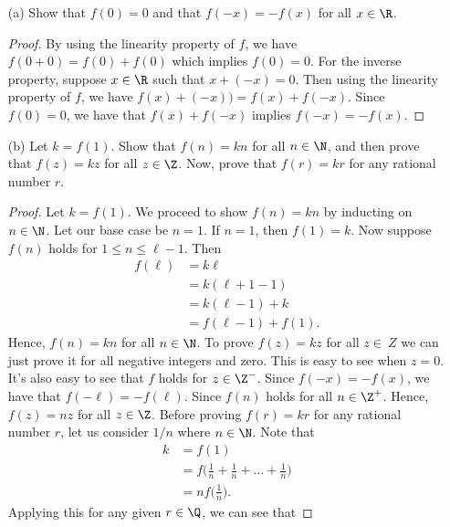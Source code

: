 \begin{enumerate}
    \item[(a)] Show that \( f(0) = 0  \) and that \( f(-x) = - f(x) \) for all \( x \in \R  \).
        \begin{proof}
        By using the linearity property of \( f \), we have \( f(0 + 0) = f(0) + f(0)  \) which implies \( f(0) = 0 \). For the inverse property, suppose \( x \in \R  \) such that \( x + (-x) = 0  \). Then using the linearity property of \( f \), we have \( f(x) + (-x)) = f(x) + f(-x)   \). Since \( f(0) = 0  \), we have that \( f(x) + f(-x) \) implies \( f(-x) = -f(x)   \).
        \end{proof}
    \item[(b)] Let \( k = f(1) \). Show that \( f(n) = k n \) for all \( n \in \N  \), and then prove that \( f(z) = kz \) for all \( z \in \Z  \). Now, prove that \( f(r) = kr \) for any rational number \( r \).
        \begin{proof}
        Let \( k = f(1) \). We proceed to show \( f(n) = kn \) by inducting on \( n \in \N  \). Let our base case be \( n = 1  \). If \( n = 1  \), then \( f(1) =  k \). Now suppose \( f(n) \) holds for \( 1 \leq n \leq \ell - 1  \). Then 
        \begin{align*}
           f(\ell) &= k \ell \\
                   &= k (\ell + 1 - 1 ) \\
                   &= k(\ell - 1) + k \\
                   &= f(\ell - 1 ) + f(1).
        \end{align*}
        Hence, \( f(n) = kn \) for all \( n \in \N  \). To prove \( f(z) = kz \) for all \( z \in \ Z \) we can just prove it for all negative integers and zero. This is easy to see when \( z = 0  \). It's also easy to see that \( f \) holds for \( z \in \Z^{-} \). Since \( f(-x) = -f(x) \), we have that \( f(-\ell) = - f(\ell) \). Since \( f(n)  \) holds for all \( n \in \Z^{+} \). Hence, \( f(z) = nz \) for all \( z \in \Z \). 
    Before proving \( f(r) = kr  \) for any rational number \( r  \), let us consider \( 1/n  \) where \( n \in \N  \). Note that 
    \begin{align*}
         k &= f(1)  \\
           &= f \Big( \frac{ 1 }{ n } + \frac{ 1 }{ n }  + \dots + \frac{ 1 }{ n }  \Big) \\
           &= n f \Big( \frac{ 1 }{ n }  \Big).
    \end{align*}
    Applying this for any given \( r \in \Q  \), we can see that 

\end{proof}
\end{enumerate}

